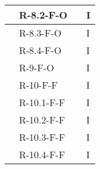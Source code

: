 \begin{center}
\begin{longtable}{ | C{2.5cm} |C{2cm} |C{7cm} |C{1.5cm}|}
                     & R-8.2-F-O          &                      & I              \\\hline
                     & R-8.3-F-O          &                      & I              \\\hline
                     & R-8.4-F-O          &                      & I              \\\hline
                     & R-9-F-O            &                      & I              \\\hline
                     & R-10-F-F           &                      & I              \\\hline
                     & R-10.1-F-F         &                      & I              \\\hline
                     & R-10.2-F-F         &                      & I              \\\hline
                     & R-10.3-F-F         &                      & I              \\\hline
                     & R-10.4-F-F         &                      & I              \\\hline


\end{longtable}
\end{center}
